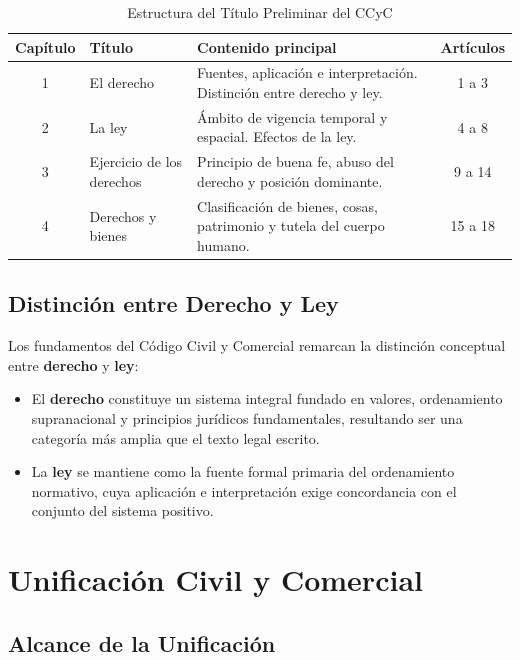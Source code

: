 \documentclass[12pt,oneside]{book}
\begin{document}
\begin{table}[H]
\centering
\caption{Estructura del Título Preliminar del CCyC}
\begin{tabular}{c p{4.5cm} p{6.5cm} c}
\toprule
\textbf{Capítulo} & \textbf{Título} & \textbf{Contenido principal} & \textbf{Artículos} \\
\midrule
1 & El derecho & Fuentes, aplicación e interpretación. Distinción entre derecho y ley. & 1 a 3 \\
2 & La ley & Ámbito de vigencia temporal y espacial. Efectos de la ley. & 4 a 8 \\
3 & Ejercicio de los derechos & Principio de buena fe, abuso del derecho y posición dominante. & 9 a 14 \\
4 & Derechos y bienes & Clasificación de bienes, cosas, patrimonio y tutela del cuerpo humano. & 15 a 18 \\
\bottomrule
\end{tabular}
\end{table}

\section{Distinción entre Derecho y Ley}

Los fundamentos del Código Civil y Comercial remarcan la distinción conceptual entre \textbf{derecho} y \textbf{ley}:
\begin{itemize}
    \item El \textbf{derecho} constituye un sistema integral fundado en valores, ordenamiento supranacional y principios jurídicos fundamentales, resultando ser una categoría más amplia que el texto legal escrito.
    \item La \textbf{ley} se mantiene como la fuente formal primaria del ordenamiento normativo, cuya aplicación e interpretación exige concordancia con el conjunto del sistema positivo.
\end{itemize}


\chapter{Unificación Civil y Comercial}

\section{Alcance de la Unificación}
\end{document}
